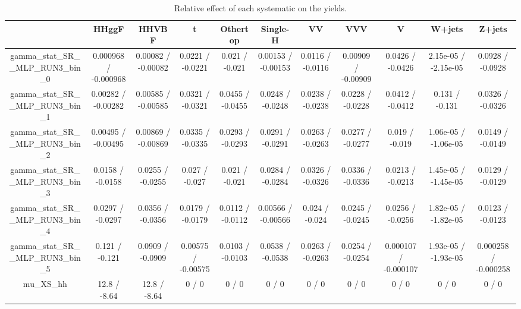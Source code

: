 \documentclass[10pt]{article}
\begin{document}
\begin{table}[htbp]
\begin{center}
\begin{tabular}{|c|c|c|c|c|c|c|c|c|c|c|}
\hline 
      & HHggF      & HHVBF      & t      & Othertop      & Single-H      & VV      & VVV      & V      & W+jets      & Z+jets \\ 
\hline 
  gamma_stat_SR__MLP_RUN3_bin_0 & 0.000968 / -0.000968 & 0.00082 / -0.00082 & 0.0221 / -0.0221 & 0.021 / -0.021 & 0.00153 / -0.00153 & 0.0116 / -0.0116 & 0.00909 / -0.00909 & 0.0426 / -0.0426 & 2.15e-05 / -2.15e-05 & 0.0928 / -0.0928 \\ 
  gamma_stat_SR__MLP_RUN3_bin_1 & 0.00282 / -0.00282 & 0.00585 / -0.00585 & 0.0321 / -0.0321 & 0.0455 / -0.0455 & 0.0248 / -0.0248 & 0.0238 / -0.0238 & 0.0228 / -0.0228 & 0.0412 / -0.0412 & 0.131 / -0.131 & 0.0326 / -0.0326 \\ 
  gamma_stat_SR__MLP_RUN3_bin_2 & 0.00495 / -0.00495 & 0.00869 / -0.00869 & 0.0335 / -0.0335 & 0.0293 / -0.0293 & 0.0291 / -0.0291 & 0.0263 / -0.0263 & 0.0277 / -0.0277 & 0.019 / -0.019 & 1.06e-05 / -1.06e-05 & 0.0149 / -0.0149 \\ 
  gamma_stat_SR__MLP_RUN3_bin_3 & 0.0158 / -0.0158 & 0.0255 / -0.0255 & 0.027 / -0.027 & 0.021 / -0.021 & 0.0284 / -0.0284 & 0.0326 / -0.0326 & 0.0336 / -0.0336 & 0.0213 / -0.0213 & 1.45e-05 / -1.45e-05 & 0.0129 / -0.0129 \\ 
  gamma_stat_SR__MLP_RUN3_bin_4 & 0.0297 / -0.0297 & 0.0356 / -0.0356 & 0.0179 / -0.0179 & 0.0112 / -0.0112 & 0.00566 / -0.00566 & 0.024 / -0.024 & 0.0245 / -0.0245 & 0.0256 / -0.0256 & 1.82e-05 / -1.82e-05 & 0.0123 / -0.0123 \\ 
  gamma_stat_SR__MLP_RUN3_bin_5 & 0.121 / -0.121 & 0.0909 / -0.0909 & 0.00575 / -0.00575 & 0.0103 / -0.0103 & 0.0538 / -0.0538 & 0.0263 / -0.0263 & 0.0254 / -0.0254 & 0.000107 / -0.000107 & 1.93e-05 / -1.93e-05 & 0.000258 / -0.000258 \\ 
  mu_XS_hh & 12.8 / -8.64 & 12.8 / -8.64 & 0 / 0 & 0 / 0 & 0 / 0 & 0 / 0 & 0 / 0 & 0 / 0 & 0 / 0 & 0 / 0 \\ 
\hline 
\end{tabular} 
\caption{Relative effect of each systematic on the yields.} 
\end{center} 
\end{table} 
\end{document}
